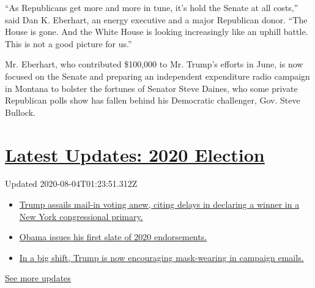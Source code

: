 ``As Republicans get more and more in tune, it's hold the Senate at all
costs,'' said Dan K. Eberhart, an energy executive and a major
Republican donor. ``The House is gone. And the White House is looking
increasingly like an uphill battle. This is not a good picture for us.''

Mr. Eberhart, who contributed \$100,000 to Mr. Trump's efforts in June,
is now focused on the Senate and preparing an independent expenditure
radio campaign in Montana to bolster the fortunes of Senator Steve
Daines, who some private Republican polls show has fallen behind his
Democratic challenger, Gov. Steve Bullock.

\hypertarget{latest-updates-2020-election}{%
\section{\texorpdfstring{\href{https://www.nytimes3xbfgragh.onion/2020/08/03/us/elections/biden-vs-trump.html?action=click\&pgtype=Article\&state=default\&region=MAIN_CONTENT_1\&context=storylines_live_updates}{Latest
Updates: 2020
Election}}{Latest Updates: 2020 Election}}\label{latest-updates-2020-election}}

Updated 2020-08-04T01:23:51.312Z

\begin{itemize}
\tightlist
\item
  \href{https://www.nytimes3xbfgragh.onion/2020/08/03/us/elections/biden-vs-trump.html?action=click\&pgtype=Article\&state=default\&region=MAIN_CONTENT_1\&context=storylines_live_updates\#link-6494b448}{Trump
  assails mail-in voting anew, citing delays in declaring a winner in a
  New York congressional primary.}
\item
  \href{https://www.nytimes3xbfgragh.onion/2020/08/03/us/elections/biden-vs-trump.html?action=click\&pgtype=Article\&state=default\&region=MAIN_CONTENT_1\&context=storylines_live_updates\#link-3de249e6}{Obama
  issues his first slate of 2020 endorsements.}
\item
  \href{https://www.nytimes3xbfgragh.onion/2020/08/03/us/elections/biden-vs-trump.html?action=click\&pgtype=Article\&state=default\&region=MAIN_CONTENT_1\&context=storylines_live_updates\#link-54e34d20}{In
  a big shift, Trump is now encouraging mask-wearing in campaign
  emails.}
\end{itemize}

\href{https://www.nytimes3xbfgragh.onion/2020/08/03/us/elections/biden-vs-trump.html?action=click\&pgtype=Article\&state=default\&region=MAIN_CONTENT_1\&context=storylines_live_updates}{See
more updates}

